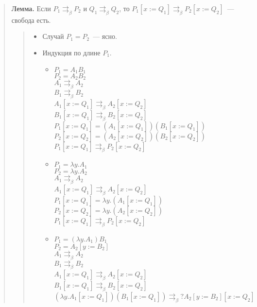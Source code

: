 \documentclass{article}
\begin{document}
	\begin{quote}
		\textbf{Лемма.} Если $P_1 \rightrightarrows_{\beta} P_2$ и $Q_1 \rightrightarrows_{\beta} Q_2$, то $P_1 [x := Q_1] \rightrightarrows_{\beta} P_2 [x := Q_2]$~--- свобода есть.
		\begin{quote}
			\begin{itemize}
				\item Случай $P_1 = P_2$~--- ясно.
				\item Индукция по длине $P_1$.
				\begin{itemize}
					\item $P_1 = A_1 B_1$ \\
					$P_2 = A_2 B_2$ \\
					$A_1 \rightrightarrows_{\beta} A_2$ \\
					$B_1 \rightrightarrows_{\beta} B_2$ \\
					$A_1 [x := Q_1] \rightrightarrows_{\beta} A_2 [x := Q_2]$ \\
					$B_1 [x := Q_1] \rightrightarrows_{\beta} B_2 [x := Q_2]$ \\
					$P_1 [x := Q_1] = (A_1[x := Q_1])(B_1 [x:= Q_1])$ \\
					$P_2 [x := Q_2] = (A_2[x := Q_2])(B_2 [x:= Q_2])$ \\
					$P_1 [x := Q_1] \rightrightarrows_{\beta} P_2 [x := Q_2]$
					\item $P_1 = \lambda y. A_1$ \\
					$P_2 = \lambda y. A_2$ \\
					$A_1 \rightrightarrows_{\beta} A_2$ \\
					$A_1 [x := Q_1] \rightrightarrows_{\beta} A_2 [x := Q_2]$ \\
					$P_1 [x := Q_1] = \lambda y. (A_1 [x := Q_1])$ \\
					$P_2 [x := Q_2] = \lambda y. (A_2 [x := Q_2])$ \\
					$P_1 [x := Q_1] \rightrightarrows_{\beta} P_2 [x := Q_2]$
					\item $P_1 = (\lambda y. A_1) B_1$ \\
					$P_2 = A_2 [y := B_2]$ \\
					$A_1 \rightrightarrows_{\beta} A_2$ \\
					$B_1 \rightrightarrows_{\beta} B_2$ \\
					$A_1 [x := Q_1] \rightrightarrows_{\beta} A_2 [x := Q_2]$ \\
					$B_1 [x := Q_1] \rightrightarrows_{\beta} B_2 [x := Q_2]$ \\
					$(\lambda y. A_1 [x := Q_1])(B_1 [x := Q_1]) \rightrightarrows_{\beta} ? A_2 [y := B_2][x := Q_2]$ \\

\end{itemize}
\end{itemize}
\end{quote}
\end{quote}
\end{document}
